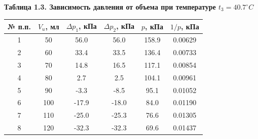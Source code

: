\documentclass[12pt]{article}
\begin{document}
\begin{flushleft}
    \begin{center}
        \textbf{Таблица 1.3. Зависимость давления от объема при температуре $ t_3 = 40.7^\circ C $} \\
    \end{center}
    \begin{table}[h]
        \centering
        \begin{tabular}{|c|c|c|c|c|c|}
            \hline
            № п.п. & $ V_u $, мл & $ \Delta p_1 $, кПа & $ \Delta p_2 $, кПа & $ p $, кПа & $ 1/p $, кПа \\
            \hline
            1  & 50  & 56.0  & 56.0  & 158.9 & 0.00629 \\
            \hline
            2  & 60  & 33.4  & 33.5  & 136.4 & 0.00733 \\
            \hline
            3  & 70  & 14.8  & 16.5  & 117.1 & 0.00854 \\
            \hline
            4  & 80  & 2.7   & 2.5   & 104.1 & 0.00961 \\
            \hline
            5  & 90  & -3.3  & -8.5  & 95.1  & 0.01052 \\
            \hline
            6  & 100 & -17.9 & -18.0 & 84.0  & 0.01190 \\
            \hline
            7  & 110 & -25.0 & -25.3 & 76.6  & 0.01305 \\
            \hline
            8  & 120 & -32.3 & -32.3 & 69.6  & 0.01437 \\
            \hline
        \end{tabular}    
    \end{table}


\end{flushleft}
\end{document}
